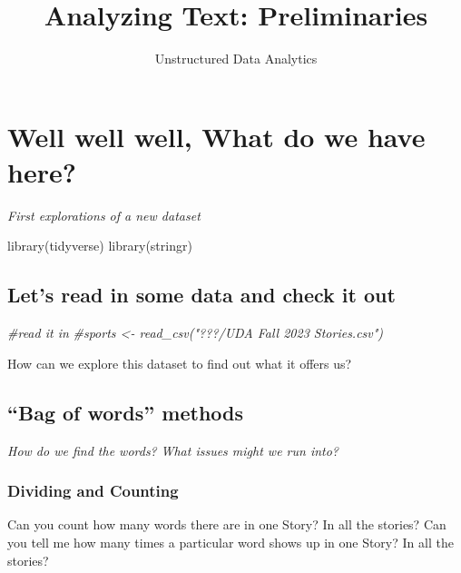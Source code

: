 \documentclass[
]{article}
\title{Analyzing Text: Preliminaries}
\author{Unstructured Data Analytics}
\date{}
\newenvironment{Shaded}{\begin{snugshade}}{\end{snugshade}}
\newcommand{\CommentTok}[1]{\textcolor[rgb]{0.56,0.35,0.01}{\textit{#1}}}
\newcommand{\FunctionTok}[1]{\textcolor[rgb]{0.00,0.00,0.00}{#1}}
\newcommand{\NormalTok}[1]{#1}
\begin{document}
\maketitle

\hypertarget{well-well-well-what-do-we-have-here}{%
\section{Well well well, What do we have
here?}\label{well-well-well-what-do-we-have-here}}

\emph{First explorations of a new dataset}

\begin{Shaded}
\begin{Highlighting}[]
\FunctionTok{library}\NormalTok{(tidyverse)}
\FunctionTok{library}\NormalTok{(stringr)}
\end{Highlighting}
\end{Shaded}

\hypertarget{lets-read-in-some-data-and-check-it-out}{%
\subsection{Let's read in some data and check it
out}\label{lets-read-in-some-data-and-check-it-out}}

\begin{Shaded}
\begin{Highlighting}[]
\CommentTok{\#read it in}
\CommentTok{\#sports \textless{}{-} read\_csv("???/UDA Fall 2023 Stories.csv")}
\end{Highlighting}
\end{Shaded}

How can we explore this dataset to find out what it offers us?

\hypertarget{bag-of-words-methods}{%
\subsection{``Bag of words'' methods}\label{bag-of-words-methods}}

\emph{How do we find the words?} \emph{What issues might we run into?}

\hypertarget{dividing-and-counting}{%
\subsubsection{Dividing and Counting}\label{dividing-and-counting}}

Can you count how many words there are in one Story? In all the stories?
Can you tell me how many times a particular word shows up in one Story?
In all the stories?
\end{document}
